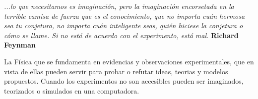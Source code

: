 \textit{...lo que necesitamos es imaginación, pero la imaginación encorsetada en la terrible camisa de fuerza que es el 
conocimiento, que no importa cuán hermosa sea tu conjetura, no importa cuán inteligente seas, quién hiciese la conjetura o cómo 
se 
llame. Si no está de acuerdo con el experimento, está mal.} \textbf{Richard Feynman}

\vspace{1.0cm}

La Física que se fundamenta en evidencias y observaciones experimentales, que en vista de ellas pueden servir para probar o 
refutar ideas, teorias y modelos propuestos. Cuando los experimentos no son accesibles pueden ser imaginados, teorizados o 
simulados en una computadora.
